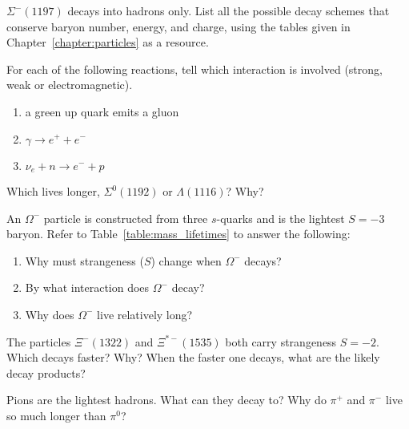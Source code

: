 \begin{problem}
$\Sigma^-(1197)$ decays into hadrons only.  List all the
possible decay schemes that conserve baryon number, energy, and
charge, using the tables given in Chapter~\ref{chapter:particles} as a
resource. 
\label{prob:Sigma_minus_decay}
\end{problem}

\begin{problem}
For each of the following reactions, tell which interaction is
  involved (strong, weak or electromagnetic).
  \begin{enumerate}
  \item a green up quark emits a gluon
  \item $\gamma \to e^+ + e^-$
  \item $\nu_e + n \to e^- + p$
  \end{enumerate}
\label{prob:identify_interaction}
\end{problem}

\begin{problem}
Which lives longer, $\Sigma^0(1192)$ or $\Lambda(1116)$?  Why?
\label{prob:compare_lifetime}
\end{problem}

\begin{problem}
An $\Omega^-$ particle is constructed from three $s$-quarks and
  is the lightest $S = -3$ baryon.  Refer to
  Table~\ref{table:mass_lifetimes} to answer the following:
  \begin{enumerate}
  \item Why must strangeness ($S$) change when $\Omega^-$ decays?
  \item By what interaction does $\Omega^-$ decay?
  \item Why does $\Omega^-$ live relatively long?
  \end{enumerate}
\label{prob:Omega_minus}
\end{problem}

\begin{problem}
The particles $\Xi^-(1322)$ and $\Xi^{*-}(1535)$ both carry
strangeness $S = -2$.  Which decays faster?  Why?  When the faster
  one decays, what are the likely decay products?
\label{prob:Xi_minus}
\end{problem}

\begin{problem}
Pions are the lightest hadrons.  What can they decay to?  Why do
  $\pi^+$ and $\pi^-$ live so much longer than $\pi^0$?
\label{prob:pion_decay}
\end{problem}

